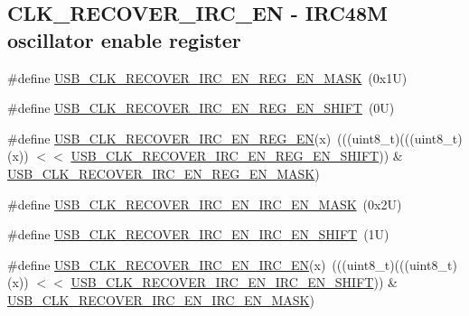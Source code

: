 \subsection*{C\+L\+K\+\_\+\+R\+E\+C\+O\+V\+E\+R\+\_\+\+I\+R\+C\+\_\+\+EN -\/ I\+R\+C48M oscillator enable register}
\begin{DoxyCompactItemize}
\item 
\#define \mbox{\hyperlink{group___u_s_b___register___masks_ga7e948ea51eeee58403c13f4c040ddb55}{U\+S\+B\+\_\+\+C\+L\+K\+\_\+\+R\+E\+C\+O\+V\+E\+R\+\_\+\+I\+R\+C\+\_\+\+E\+N\+\_\+\+R\+E\+G\+\_\+\+E\+N\+\_\+\+M\+A\+SK}}~(0x1\+U)
\item 
\#define \mbox{\hyperlink{group___u_s_b___register___masks_ga988c7c957c1cb5e0b15d837f929da78b}{U\+S\+B\+\_\+\+C\+L\+K\+\_\+\+R\+E\+C\+O\+V\+E\+R\+\_\+\+I\+R\+C\+\_\+\+E\+N\+\_\+\+R\+E\+G\+\_\+\+E\+N\+\_\+\+S\+H\+I\+FT}}~(0\+U)
\item 
\#define \mbox{\hyperlink{group___u_s_b___register___masks_gabe4ce60e9a611bbd29f16bc9a09781b6}{U\+S\+B\+\_\+\+C\+L\+K\+\_\+\+R\+E\+C\+O\+V\+E\+R\+\_\+\+I\+R\+C\+\_\+\+E\+N\+\_\+\+R\+E\+G\+\_\+\+EN}}(x)~(((uint8\+\_\+t)(((uint8\+\_\+t)(x)) $<$$<$ \mbox{\hyperlink{group___u_s_b___register___masks_ga988c7c957c1cb5e0b15d837f929da78b}{U\+S\+B\+\_\+\+C\+L\+K\+\_\+\+R\+E\+C\+O\+V\+E\+R\+\_\+\+I\+R\+C\+\_\+\+E\+N\+\_\+\+R\+E\+G\+\_\+\+E\+N\+\_\+\+S\+H\+I\+FT}})) \& \mbox{\hyperlink{group___u_s_b___register___masks_ga7e948ea51eeee58403c13f4c040ddb55}{U\+S\+B\+\_\+\+C\+L\+K\+\_\+\+R\+E\+C\+O\+V\+E\+R\+\_\+\+I\+R\+C\+\_\+\+E\+N\+\_\+\+R\+E\+G\+\_\+\+E\+N\+\_\+\+M\+A\+SK}})
\item 
\#define \mbox{\hyperlink{group___u_s_b___register___masks_ga0ec64449ae278fc895d80fe9d85882be}{U\+S\+B\+\_\+\+C\+L\+K\+\_\+\+R\+E\+C\+O\+V\+E\+R\+\_\+\+I\+R\+C\+\_\+\+E\+N\+\_\+\+I\+R\+C\+\_\+\+E\+N\+\_\+\+M\+A\+SK}}~(0x2\+U)
\item 
\#define \mbox{\hyperlink{group___u_s_b___register___masks_ga2e1faca39a2e63ef3c4939b39e8b10c0}{U\+S\+B\+\_\+\+C\+L\+K\+\_\+\+R\+E\+C\+O\+V\+E\+R\+\_\+\+I\+R\+C\+\_\+\+E\+N\+\_\+\+I\+R\+C\+\_\+\+E\+N\+\_\+\+S\+H\+I\+FT}}~(1\+U)
\item 
\#define \mbox{\hyperlink{group___u_s_b___register___masks_gac47a28e4b3e9a5ff688770af8f7d6fc1}{U\+S\+B\+\_\+\+C\+L\+K\+\_\+\+R\+E\+C\+O\+V\+E\+R\+\_\+\+I\+R\+C\+\_\+\+E\+N\+\_\+\+I\+R\+C\+\_\+\+EN}}(x)~(((uint8\+\_\+t)(((uint8\+\_\+t)(x)) $<$$<$ \mbox{\hyperlink{group___u_s_b___register___masks_ga2e1faca39a2e63ef3c4939b39e8b10c0}{U\+S\+B\+\_\+\+C\+L\+K\+\_\+\+R\+E\+C\+O\+V\+E\+R\+\_\+\+I\+R\+C\+\_\+\+E\+N\+\_\+\+I\+R\+C\+\_\+\+E\+N\+\_\+\+S\+H\+I\+FT}})) \& \mbox{\hyperlink{group___u_s_b___register___masks_ga0ec64449ae278fc895d80fe9d85882be}{U\+S\+B\+\_\+\+C\+L\+K\+\_\+\+R\+E\+C\+O\+V\+E\+R\+\_\+\+I\+R\+C\+\_\+\+E\+N\+\_\+\+I\+R\+C\+\_\+\+E\+N\+\_\+\+M\+A\+SK}})
\end{DoxyCompactItemize}
